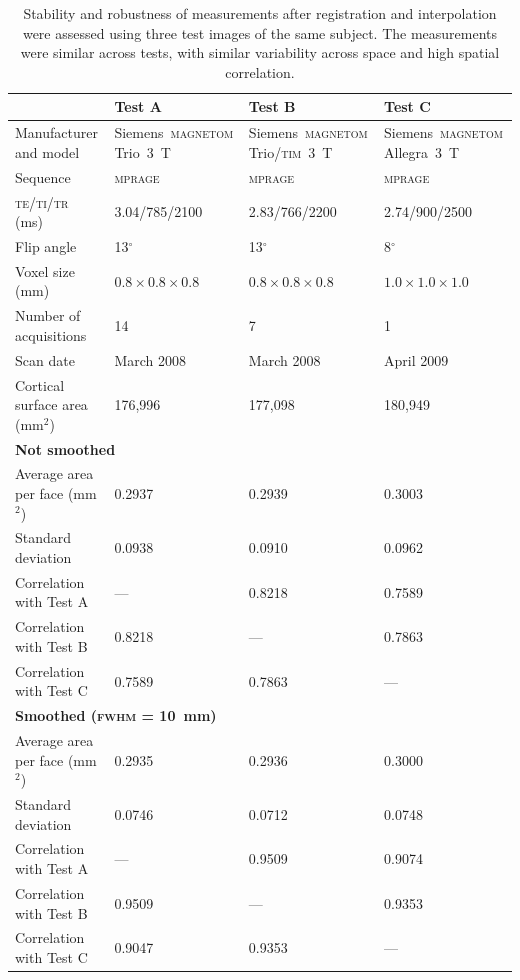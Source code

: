 \begin{table}[!tp]
\caption[Stability of areal measurements.]{Stability and robustness of measurements after registration and interpolation were assessed using three test images of the same subject. The measurements were similar across tests, with similar variability across space and high spatial correlation.}
\begin{center}
{\footnotesize
\begin{tabular}{@{}l@{}m{33mm}<{\centering}@{}m{33mm}<{\centering}@{}m{33mm}<{\centering}@{}}
\toprule
{} & \textbf{Test A} & \textbf{Test B} & \textbf{Test C}\\
\midrule
Manufacturer and model & Siemens~\textsc{magnetom} Trio~3~T & Siemens~\textsc{magnetom} Trio/\textsc{tim}~3~T & Siemens~\textsc{magnetom} Allegra~3~T \\
Sequence & \textsc{mprage} & \textsc{mprage} & \textsc{mprage} \\
\textsc{te/ti/tr} (ms) & 3.04/785/2100 & 2.83/766/2200 & 2.74/900/2500 \\
Flip angle & 13$^{\circ}$ & 13$^{\circ}$ & 8$^{\circ}$ \\
Voxel size (mm) & $0.8 \times 0.8 \times 0.8$ & $0.8 \times 0.8 \times 0.8$ & $1.0 \times 1.0 \times 1.0$ \\
Number of acquisitions & 14 & 7 & 1 \\
Scan date & March 2008 & March 2008 & April 2009 \\
Cortical surface area (mm$^2$) & 176,996 & 177,098 & 180,949 \\
\midrule
\multicolumn{4}{l}{\textbf{Not smoothed}}\\
Average area per face (mm$^2$) & 0.2937 & 0.2939 & 0.3003 \\
Standard deviation             & 0.0938 & 0.0910 & 0.0962 \\
Correlation with Test A        &    --- & 0.8218 & 0.7589 \\
Correlation with Test B        & 0.8218 &    --- & 0.7863 \\
Correlation with Test C        & 0.7589 & 0.7863 &    --- \\
\midrule
\multicolumn{4}{l}{\textbf{Smoothed (\textsc{fwhm} = 10~mm)}}\\
Average area per face (mm$^2$) & 0.2935 & 0.2936 & 0.3000 \\
Standard deviation             & 0.0746 & 0.0712 & 0.0748 \\
Correlation with Test A        &    --- & 0.9509 & 0.9074 \\
Correlation with Test B        & 0.9509 &    --- & 0.9353 \\
Correlation with Test C        & 0.9047 & 0.9353 &    --- \\
\bottomrule
\end{tabular}}
\end{center}
\label{tab:areal:retest}
\end{table}

